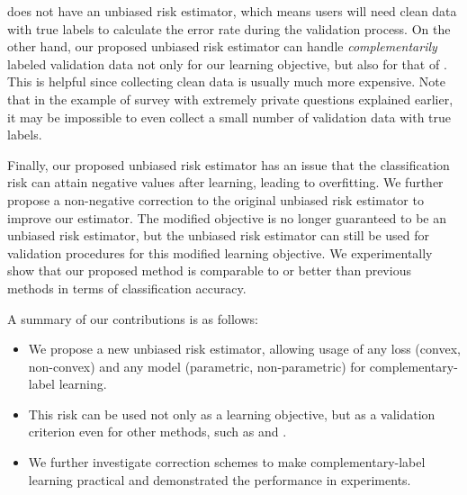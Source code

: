 \documentclass{article}
\begin{document}
\citet{yu17eccv} does not have an unbiased risk estimator, which means users will need clean data with true labels to calculate the error rate during the validation process.
On the other hand, our proposed unbiased risk estimator can handle \emph{complementarily} labeled validation data not only for our learning objective, but also for that of \citet{yu17eccv}.
This is helpful since collecting clean data is usually much more expensive.  Note that in the example of survey with extremely private questions explained earlier, it may be impossible to even collect a small number of validation data with true labels.

Finally, our proposed unbiased risk estimator has an issue that the classification risk can attain negative values after learning, leading to overfitting.
We further propose a non-negative correction to the original unbiased risk estimator to improve our estimator.
The modified objective is no longer guaranteed to be an unbiased risk estimator, but the unbiased risk estimator can still be used for validation procedures for this modified learning objective.
We experimentally show that our proposed method is comparable to or better than previous methods \citep{ishida17nips,yu17eccv} in terms of classification accuracy.

A summary of our contributions is as follows:
\begin{itemize}
  \item We propose a new unbiased risk estimator, allowing usage of any loss (convex, non-convex) and any model (parametric, non-parametric) for complementary-label learning.
  \item This risk can be used not only as a learning objective, but as a validation criterion even for other methods, such as \citet{ishida17nips} and \citet{yu17eccv}.
  \item We further investigate correction schemes to make complementary-label learning practical and demonstrated the performance in experiments.
\end{itemize}
\end{document}
